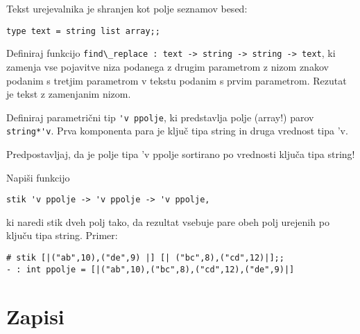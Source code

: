 \begin{ex}
  Tekst urejevalnika je shranjen kot polje seznamov besed:

\begin{lstlisting}
type text = string list array;;
\end{lstlisting}
  
  Definiraj funkcijo \lstinline{find\_replace : text -> string -> string -> text},
  ki zamenja vse pojavitve niza podanega z drugim parametrom z nizom
  znakov podanim s tretjim parametrom v tekstu podanim s prvim
  parametrom. Rezutat je tekst z zamenjanim nizom.
\end{ex} 




\begin{ex}
Definiraj parametri\v cni tip 
\lstinline{'v ppolje}, ki predstavlja polje (array!) parov
\lstinline{string*'v}. Prva komponenta para je klju\v c tipa string in druga vrednost tipa 'v.

Predpostavljaj, da je polje tipa 'v ppolje sortirano po vrednosti klju\v ca tipa string!  

Napi\v si funkcijo
\begin{lstlisting}
stik 'v ppolje -> 'v ppolje -> 'v ppolje, 
\end{lstlisting}
ki naredi stik dveh polj tako, da rezultat vsebuje pare obeh polj urejenih po klju\v cu tipa string. 
Primer:

\begin{lstlisting}
# stik [|("ab",10),("de",9) |] [| ("bc",8),("cd",12)|];;
- : int ppolje = [|("ab",10),("bc",8),("cd",12),("de",9)|]

\end{lstlisting}

\end{ex} 




\section{Zapisi}




